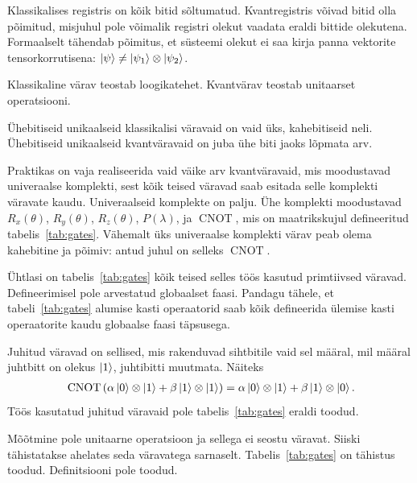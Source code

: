 \documentclass[12pt]{report}
\def\paren#1{\left(#1\right)}
\def\ket#1{\mathinner{|#1\rangle}}
\def\CNOT{\mathop{\mathrm{CNOT}}\nolimits}
\begin{document}
Klassikalises registris on kõik bitid sõltumatud. Kvantregistris võivad bitid
olla põimitud, misjuhul pole võimalik registri olekut vaadata eraldi bittide
olekutena. Formaalselt tähendab põimitus, et süsteemi olekut ei saa kirja panna
vektorite tensorkorrutisena: \(\ket{\psi} \ne \ket{\psi_1} \otimes
\ket{\psi_2}\).

Klassikaline värav teostab loogikatehet. Kvantvärav teostab unitaarset
operatsiooni.

Ühebitiseid unikaalseid klassikalisi väravaid on vaid üks, kahebitiseid neli.
Ühebitiseid unikaalseid kvantväravaid on juba ühe biti jaoks lõpmata arv.

Praktikas on vaja realiseerida vaid väike arv kvantväravaid, mis moodustavad
univeraalse komplekti, sest kõik teised väravad saab esitada selle komplekti
väravate kaudu. Univeraalseid komplekte on palju. Ühe komplekti moodustavad
\(R_x(\theta)\), \(R_y(\theta)\), \(R_z(\theta)\), \(P(\lambda)\), ja
\(\CNOT\), mis on maatrikskujul defineeritud tabelis~\ref{tab:gates}. Vähemalt
üks univeraalse komplekti värav peab olema kahebitine ja põimiv: antud juhul on
selleks \(\CNOT\).

Ühtlasi on tabelis~\ref{tab:gates} kõik teised selles töös kasutud primtiivsed
väravad. Defineerimisel pole arvestatud globaalset faasi. Pandagu tähele, et
tabeli~\ref{tab:gates} alumise kasti operaatorid saab kõik defineerida ülemise
kasti operaatorite kaudu globaalse faasi täpsusega.

Juhitud väravad on sellised, mis rakenduvad sihtbitile vaid sel määral, mil
määral juhtbitt on olekus \(\ket1\), juhtibitti muutmata. Näiteks
\begin{align}
    \CNOT \paren{\alpha \ket{0} \otimes \ket{1} + \beta \ket{1} \otimes \ket{1}}
    = \alpha \ket{0} \otimes \ket{1} + \beta \ket{1} \otimes \ket{0} \rlap{.}
\end{align}
Töös kasutatud juhitud väravaid pole tabelis~\ref{tab:gates} eraldi toodud.

Mõõtmine pole unitaarne operatsioon ja sellega ei seostu väravat. Siiski
tähistatakse ahelates seda väravatega sarnaselt. Tabelis~\ref{tab:gates} on
tähistus toodud. Definitsiooni pole toodud.
\end{document}
